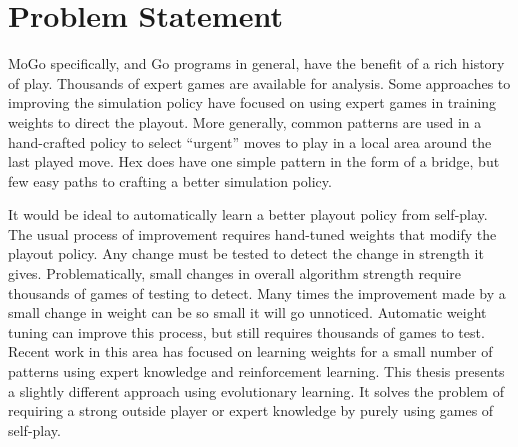 \documentclass[11pt]{report}
\begin{document}
\section{Problem Statement}\label{problem}
MoGo specifically, and Go programs in general, have the benefit of a rich history of play. Thousands of expert games are available for analysis. Some approaches to improving the simulation policy have focused on using expert games in training weights to direct the playout\cite{chaslot2010adding}. More generally, common patterns are used in a hand-crafted policy to select ``urgent'' moves to play in a local area around the last played move. Hex does have one simple pattern in the form of a bridge\cite{anshelevich2002hierarchical}, but few easy paths to crafting a better simulation policy.

It would be ideal to automatically learn a better playout policy from self-play. The usual process of improvement requires hand-tuned weights that modify the playout policy. Any change must be tested to detect the change in strength it gives. Problematically, small changes in overall algorithm strength require thousands of games of testing to detect. Many times the improvement made by a small change in weight can be so small it will go unnoticed. Automatic weight tuning can improve this process, but still requires thousands of games to test. Recent work in this area has focused on learning weights for a small number of patterns using expert knowledge and reinforcement learning\cite{silver2009monte}. This thesis presents a slightly different approach using evolutionary learning. It solves the problem of requiring a strong outside player or expert knowledge by purely using games of self-play.
\end{document}

